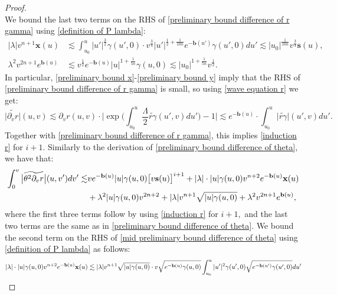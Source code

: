 \documentclass[10pt,a4paper]{amsart}
\begin{document}
\begin{proof}
\begin{equation}
    \end{equation}
    We bound the last two terms on the RHS of \eqref{preliminary bound difference of r gamma} using \eqref{definition of P lambda}:
    \begin{align}
        |\lambda| v^{n+1}\mathbf{x}(u)&\lesssim\int_{u_0}^u|u'|^{\frac{3}{2}}\gamma(u',0)\cdot v^{\frac{3}{4}}|u'|^{\frac{1}{2}+\frac{1}{10n}}e^{-\mathbf{b}(u')}\gamma(u',0)du'\lesssim |u_0|^{\frac{1}{10n}}v^{\frac{3}{4}}\mathbf{s}(u),\label{preliminary bound x}\\
        \lambda^2v^{2n+1}e^{\mathbf{b}(u)}&\lesssim v^{\frac{1}{2}}e^{-\mathbf{b}(u)}|u|^{1+\frac{1}{5n}}\gamma(u,0)\lesssim|u_0|^{1+\frac{1}{5n}}v^{\frac{1}{2}}.\label{preliminary bound y}
    \end{align}
    In particular, \eqref{preliminary bound x}-\eqref{preliminary bound y} imply that the RHS of \eqref{preliminary bound difference of r gamma} is small, so using \eqref{wave equation r} we get:
    \begin{equation}\label{preliminary bound difference of dv r}
        \big|\widetilde{\partial_vr}\big|(u,v)\lesssim\partial_vr(u,v)\cdot\bigg|\exp\bigg(\int_{u_0}^u\frac{\Lambda}{2}\widetilde{r\gamma}(u',v)du'\bigg)-1\bigg|\lesssim e^{-\mathbf{b}(u)}\cdot\int_{u_0}^u\big|\widetilde{r\gamma}\big|(u',v)du'.
    \end{equation}
    Together with \eqref{preliminary bound difference of r gamma}, this implies \eqref{induction r} for $i+1.$ Similarly to the derivation of \eqref{preliminary bound difference of theta}, we have that:
    \begin{align}
        \int_0^v\big|\widetilde{\theta^2\partial_vr}\big|(u,v')dv'\lesssim&ve^{-\mathbf{b}(u)}|u|\gamma(u,0)\big[v\mathbf{s}(u)\big]^{i+1}+|\lambda|\cdot|u|\gamma(u,0)v^{n+2}e^{-\mathbf{b}(u)}\mathbf{x}(u)\label{mid preliminary bound difference of theta}\\
        &+\lambda^2|u|\gamma(u,0)v^{2n+2}+|\lambda| v^{n+1}\sqrt{|u|\gamma(u,0)}+\lambda^2v^{2n+1}e^{\mathbf{b}(u)},\notag
    \end{align}
    where the first three terms follow by using \eqref{induction r} for $i+1,$ and the last two terms are the same as in \eqref{preliminary bound difference of theta}. We bound the second term on the RHS of \eqref{mid preliminary bound difference of theta} using \eqref{definition of P lambda} as follows:
    \begin{align}\label{some bound I need later}
        |\lambda|\cdot|u|\gamma(u,0)v^{n+2}e^{-\mathbf{b}(u)}\mathbf{x}(u)&\lesssim|\lambda| v^{n+1}\sqrt{|u|\gamma(u,0)}\cdot v\sqrt{e^{-\mathbf{b}(u)}\gamma(u,0)}\int_{u_0}^u|u'|^2\gamma(u',0)\sqrt{e^{-\mathbf{b}(u')}\gamma(u',0)}du'\notag\\

\end{align}
\end{proof}
\end{document}
